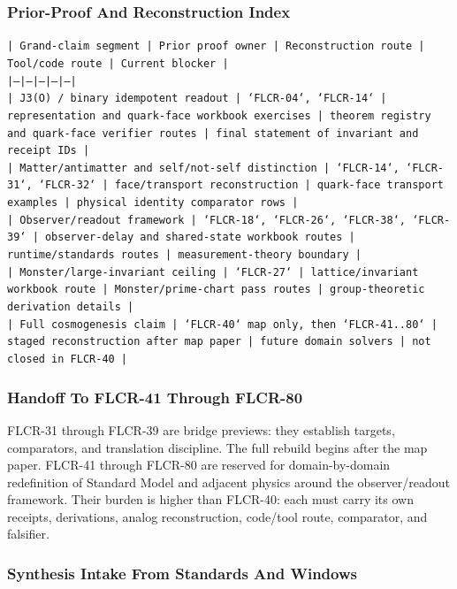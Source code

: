 \documentclass[11pt]{article}
\begin{document}
\subsubsection*{Prior-Proof And Reconstruction Index}

\noindent\texttt{| Grand-claim segment | Prior proof owner | Reconstruction route | Tool/code route | Current blocker |}\\
\noindent\texttt{|---|---|---|---|---|}\\
\noindent\texttt{| J3(O) / binary idempotent readout | `FLCR-04`, `FLCR-14` | representation and quark-face workbook exercises | theorem registry and quark-face verifier routes | final statement of invariant and receipt IDs |}\\
\noindent\texttt{| Matter/antimatter and self/not-self distinction | `FLCR-14`, `FLCR-31`, `FLCR-32` | face/transport reconstruction | quark-face transport examples | physical identity comparator rows |}\\
\noindent\texttt{| Observer/readout framework | `FLCR-18`, `FLCR-26`, `FLCR-38`, `FLCR-39` | observer-delay and shared-state workbook routes | runtime/standards routes | measurement-theory boundary |}\\
\noindent\texttt{| Monster/large-invariant ceiling | `FLCR-27` | lattice/invariant workbook route | Monster/prime-chart pass routes | group-theoretic derivation details |}\\
\noindent\texttt{| Full cosmogenesis claim | `FLCR-40` map only, then `FLCR-41..80` | staged reconstruction after map paper | future domain solvers | not closed in FLCR-40 |}\\

\subsubsection*{Handoff To FLCR-41 Through FLCR-80}

FLCR-31 through FLCR-39 are bridge previews: they establish targets, comparators, and translation discipline. The full rebuild begins after the map paper. FLCR-41 through FLCR-80 are reserved for domain-by-domain redefinition of Standard Model and adjacent physics around the observer/readout framework. Their burden is higher than FLCR-40: each must carry its own receipts, derivations, analog reconstruction, code/tool route, comparator, and falsifier.


\subsubsection*{Synthesis Intake From Standards And Windows}
\end{document}
